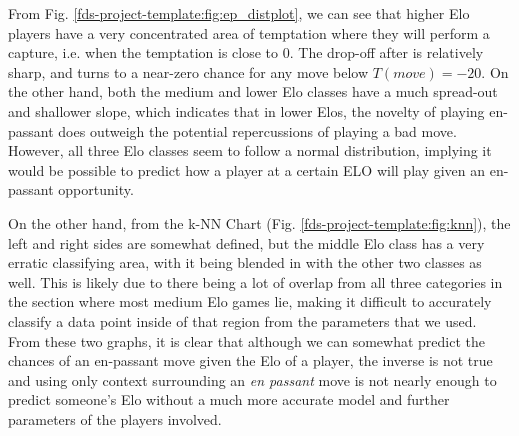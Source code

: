 \documentclass[10pt,a4paper]{article}
\begin{document}
\begin{multicols}{2}
From Fig. \ref{fds-project-template:fig:ep_distplot}, we can see that higher Elo players have a very concentrated area of temptation where they will perform a capture, i.e. when the temptation is close to $0$. The drop-off after is relatively sharp, and turns to a near-zero chance for any move below $T(move)=-20$. On the other hand, both the medium and lower Elo classes have a much spread-out and shallower slope, which indicates that in lower Elos, the novelty of playing en-passant does outweigh the potential repercussions of playing a bad move. However, all three Elo classes seem to follow a normal distribution, implying it would be possible to predict how a player at a certain ELO will play given an en-passant opportunity.\newline

On the other hand, from the k-NN Chart (Fig. \ref{fds-project-template:fig:knn}), the left and right sides are somewhat defined, but the middle Elo class has a very erratic classifying area, with it being blended in with the other two classes as well. This is likely due to there being a lot of overlap from all three categories in the section where most medium Elo games lie, making it difficult to accurately classify a data point inside of that region from the parameters that we used. From these two graphs, it is clear that although we can somewhat predict the chances of an en-passant move given the Elo of a player, the inverse is not true and using only context surrounding an \textit{en passant} move is not nearly enough to predict someone's Elo without a much more accurate model and further parameters of the players involved. \newline


\end{multicols}
\end{document}
